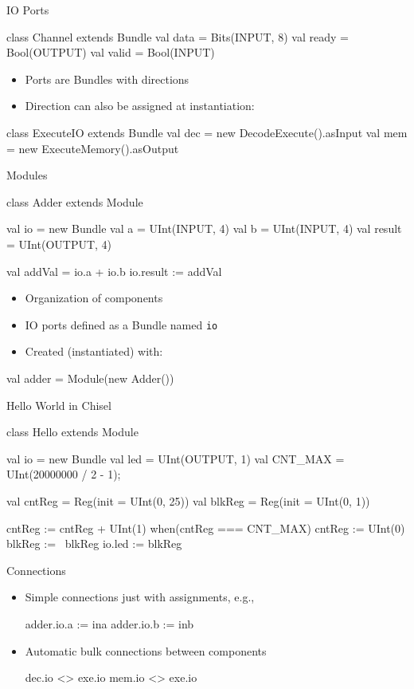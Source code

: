 \documentclass[xcolor=pdflatex,dvipsnames,table]{beamer}
\newcommand{\code}[1]{{\texttt{#1}}}
\begin{document}
\begin{frame}[fragile]{IO Ports}
\begin{chisel}
class Channel extends Bundle {
  val data = Bits(INPUT, 8)
  val ready = Bool(OUTPUT)
  val valid = Bool(INPUT)
}
\end{chisel}
\begin{itemize}
\item Ports are Bundles with directions
\item Direction can also be assigned at instantiation:
\end{itemize}
\begin{chisel}
class ExecuteIO extends Bundle {
  val dec = new DecodeExecute().asInput
  val mem = new ExecuteMemory().asOutput
}
\end{chisel}
\end{frame}

\begin{frame}[fragile]{Modules}
\begin{chisel}
class Adder extends Module {
  val io = new Bundle {
    val a = UInt(INPUT, 4)
    val b = UInt(INPUT, 4)
    val result = UInt(OUTPUT, 4)
  }

  val addVal = io.a + io.b
  io.result := addVal
}
\end{chisel}
\begin{itemize}
\item Organization of components
\item IO ports defined as a Bundle named \code{io}
\item Created (instantiated) with:
\end{itemize}
\begin{chisel}
val adder = Module(new Adder())
\end{chisel}
\end{frame}

\begin{frame}[fragile]{Hello World in Chisel}
\begin{chisel}
class Hello extends Module {
  val io = new Bundle {
    val led = UInt(OUTPUT, 1)
  }
  val CNT_MAX = UInt(20000000 / 2 - 1);
  
  val cntReg = Reg(init = UInt(0, 25))
  val blkReg = Reg(init = UInt(0, 1))

  cntReg := cntReg + UInt(1)
  when(cntReg === CNT_MAX) {
    cntReg := UInt(0)
    blkReg := ~blkReg
  }
  io.led := blkReg
}
\end{chisel}
\end{frame}

\begin{frame}[fragile]{Connections}
\begin{itemize}
\item Simple connections just with assignments, e.g.,
\begin{chisel}
  adder.io.a := ina
  adder.io.b := inb
\end{chisel}
\item Automatic bulk connections between components
\begin{chisel}
  dec.io <> exe.io
  mem.io <> exe.io
\end{chisel}
\end{itemize}
\end{frame}
\end{document}
